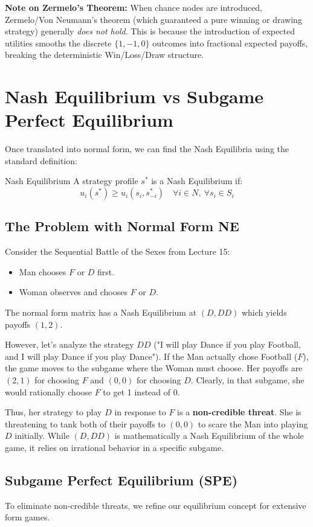 \documentclass[12pt, a4paper]{article}
\begin{document}
\textbf{Note on Zermelo's Theorem:}
When chance nodes are introduced, Zermelo/Von Neumann's theorem (which guaranteed a pure winning or drawing strategy) generally \textit{does not hold}. This is because the introduction of expected utilities smooths the discrete $\{1, -1, 0\}$ outcomes into fractional expected payoffs, breaking the deterministic Win/Loss/Draw structure.

\section{Nash Equilibrium vs Subgame Perfect Equilibrium}

Once translated into normal form, we can find the Nash Equilibria using the standard definition:
\begin{defbox}{Nash Equilibrium}
  A strategy profile $s^*$ is a Nash Equilibrium if:
  \[ u_i(s^*) \geq u_i(s_i, s_{-i}^*) \quad \forall i \in N, \ \forall s_i \in S_i \]
\end{defbox}

\subsection{The Problem with Normal Form NE}
Consider the Sequential Battle of the Sexes from Lecture 15:
\begin{itemize}
    \item Man chooses $F$ or $D$ first.
    \item Woman observes and chooses $F$ or $D$.
\end{itemize}
The normal form matrix has a Nash Equilibrium at $(D, DD)$ which yields payoffs $(1,2)$. 

However, let's analyze the strategy $DD$ ("I will play Dance if you play Football, and I will play Dance if you play Dance"). 
If the Man actually chose Football ($F$), the game moves to the subgame where the Woman must choose. Her payoffs are $(2,1)$ for choosing $F$ and $(0,0)$ for choosing $D$. 
Clearly, in that subgame, she would rationally choose $F$ to get 1 instead of 0. 

Thus, her strategy to play $D$ in response to $F$ is a \textbf{non-credible threat}. She is threatening to tank both of their payoffs to $(0,0)$ to scare the Man into playing $D$ initially. While $(D, DD)$ is mathematically a Nash Equilibrium of the whole game, it relies on irrational behavior in a specific subgame.

\subsection{Subgame Perfect Equilibrium (SPE)}
To eliminate non-credible threats, we refine our equilibrium concept for extensive form games.
\end{document}
